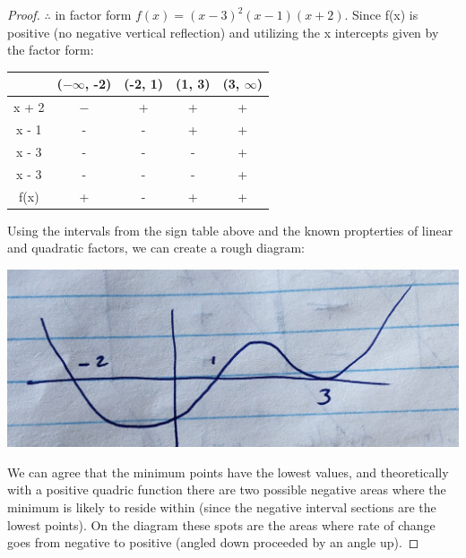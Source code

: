 \documentclass[12pt]{book}
\begin{document}
\begin{enumerate}
\begin{proof}
\newpage

$\therefore$ in factor form $f(x) = {(x-3)}^2(x-1)(x+2)$. Since f(x) is positive 
(no negative vertical reflection) and utilizing the x intercepts given by the factor form:

\begin{center}
    \begin{tabular}{|c|c|c|c|c|}
        \hline
        & ($-\infty$, -2) & (-2, 1) & (1, 3) & (3, $\infty$) \\ \hline
        x + 2 & $-$ & + & + & + \\ \hline
        x - 1 & - & - & + & + \\ \hline
        x - 3 & - & - & - & + \\ \hline
        x - 3 & - & - & - & + \\ \hline
        f(x) & + & - & + & + \\ \hline
    \end{tabular}
\end{center}

Using the intervals from the sign table above and the known propterties 
of linear and quadratic factors, we can create a rough diagram:

\begin{center}
    \includegraphics[scale=0.06]{A2-2 Diagram.jpeg}
\end{center}

\vspace{0.5cm}
We can agree that the minimum points have the lowest values, and theoretically 
with a positive quadric function there are two possible negative areas where the minimum
is likely to reside within (since the negative interval sections are the lowest points). 
On the diagram these spots are the areas where rate of change goes from negative to 
positive (angled down proceeded by an angle up).

\vspace{1cm}
\end{proof}


\end{enumerate}
\end{document}
